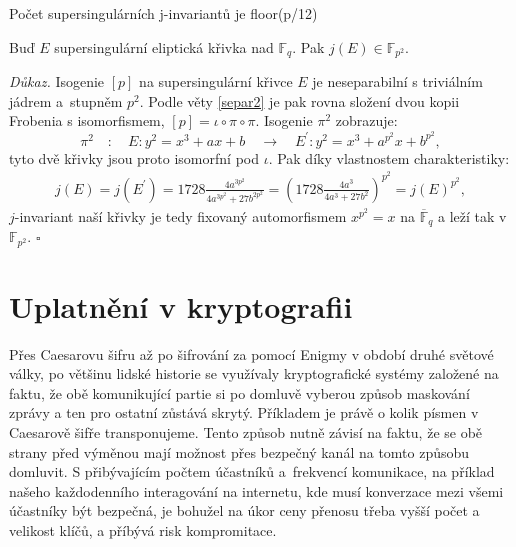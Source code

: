 \documentclass [12pt]{report}
\begin{document}
Počet supersingulárních j-invariantů je floor(p/12)


\begin{veta}
Buď $E$ supersingulární eliptická křivka nad $\mathbb{F}_q$. Pak $j(E) \in \mathbb{F}_{p^2}$.
\end{veta}
\noindent \textit{Důkaz.} Isogenie $[p]$ na supersingulární křivce $E$ je neseparabilní s triviálním jádrem a~stupněm $p^2$. Podle věty \ref{separ2} je pak rovna složení dvou kopii Frobenia s isomorfismem, $[p] = \iota \circ \pi \circ \pi$. Isogenie $\pi^2$ zobrazuje:
\begin{equation*}
\pi^2 \quad : \quad E: y^2 = x^3+ax+b  \quad \longrightarrow \quad E^\prime : y^2 = x^3 + a^{p^2}x + b^{p^2},
\end{equation*}
tyto dvě křivky jsou proto isomorfní pod $\iota$. Pak díky vlastnostem charakteristiky:
\begin{align*}
 j(E) = j(E^\prime) = 1728 \frac{4 a^{3 p^2}}{4 a^{3 p^2} + 27 b^{2 p^2}} = \left( 1728 \frac{4 a^3}{4a^3+27b^2} \right)^{p^2} = j(E)^{p^2},
\end{align*}
$j$-invariant naší křivky je tedy fixovaný automorfismem $x^{p^2} = x$ na $\overline{\mathbb{F}}_q$ a leží tak v $\mathbb{F}_{p^2}$. \hfill $\square$\\



\chapter{Uplatnění v kryptografii}

Přes Caesarovu šifru až po šifrování za pomocí Enigmy v období druhé světové války, po většinu lidské historie se využívaly kryptografické systémy založené na faktu, že obě komunikující partie si po domluvě vyberou způsob maskování zprávy a ten pro ostatní zůstává skrytý. Příkladem je právě o kolik písmen v Caesarově šifře transponujeme. Tento způsob nutně závisí na faktu, že se obě strany před výměnou mají možnost přes bezpečný kanál na tomto způsobu domluvit. S přibývajícím počtem účastníků a~frekvencí komunikace, na příklad našeho každodenního interagování na internetu, kde musí konverzace mezi všemi účastníky být bezpečná, je bohužel na úkor ceny přenosu třeba vyšší počet a velikost klíčů, a příbývá risk kompromitace.\\
\end{document}
